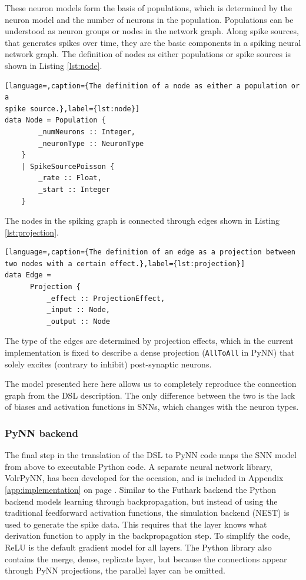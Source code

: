 These neuron models form the basis of populations, which is determined by the
neuron model and the number of neurons in the population.
Populations can be understood as neuron groups or nodes in the network graph.
Along spike sources, that generates spikes over time, they are the 
basic components in a spiking neural network graph.
The definition of nodes as either populations or spike sources is shown in
Listing \ref{lst:node}.

\begin{lstlisting}[language=,caption={The definition of a node as either a population or a
spike source.},label={lst:node}]
data Node = Population {
        _numNeurons :: Integer,
        _neuronType :: NeuronType
    }
    | SpikeSourcePoisson {
        _rate :: Float,
        _start :: Integer
    }
\end{lstlisting}

The nodes in the spiking graph is connected through edges shown in 
Listing \ref{lst:projection}.

\begin{lstlisting}[language=,caption={The definition of an edge as a projection between
two nodes with a certain effect.},label={lst:projection}]
data Edge =
      Projection {
          _effect :: ProjectionEffect,
          _input :: Node,
          _output :: Node
\end{lstlisting}

The type of the edges are determined by projection effects, which
in the current implementation is fixed to describe a 
dense projection (\texttt{AllToAll} in PyNN) that solely
excites (contrary to inhibit) post-synaptic neurons.

The model presented here here allows us to completely reproduce the connection
graph from the \gls{DSL} description.
The only difference between the two is the lack of biases and activation functions
in \glspl{SNN}, which changes with the neuron types.

\subsubsection{PyNN backend}
The final step in the translation of the \gls{DSL} to PyNN code maps the
\gls{SNN} model from above to executable Python code.
A separate neural network library, VolrPyNN, has been developed for the
occasion, and is included in Appendix \ref{app:implementation} on page
\pageref{app:implementation_volrpynn}.
Similar to the Futhark backend the Python backend models learning through
backpropagation, but instead of using the traditional feedforward activation
functions, the simulation backend (NEST) is used to generate the spike data.
This requires that the layer knows what derivation function to apply in
the backpropagation step.
To simplify the code, ReLU is the default gradient model for all layers.
The Python library also contains the merge, dense,
replicate layer, but because the connections appear through
PyNN projections, the parallel layer can be omitted.

